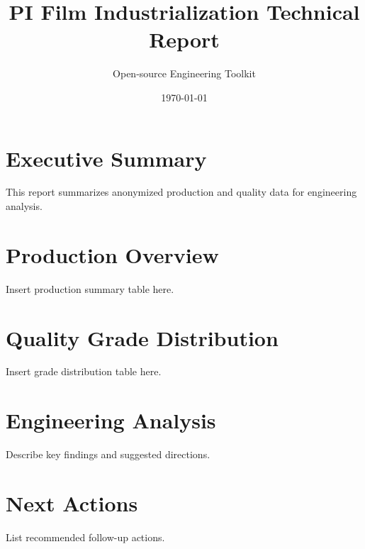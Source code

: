 \documentclass[11pt]{article}
\title{PI Film Industrialization Technical Report}
\author{Open-source Engineering Toolkit}
\date{\today}
\begin{document}
\maketitle

\section{Executive Summary}
This report summarizes anonymized production and quality data for engineering analysis.

\section{Production Overview}
Insert production summary table here.

\section{Quality Grade Distribution}
Insert grade distribution table here.

\section{Engineering Analysis}
Describe key findings and suggested directions.

\section{Next Actions}
List recommended follow-up actions.
\end{document}
